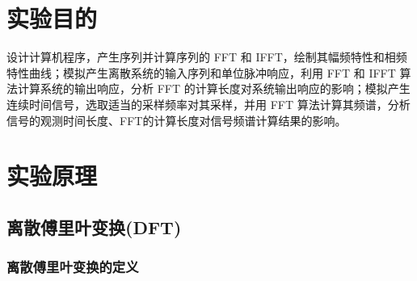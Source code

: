 \documentclass[12pt,AutoFakeBold]{article}
\begin{document}
\maketitle
\setcounter{tocdepth}{2}
\tableofcontents  %

\makeatletter
\begin{center}
    \LARGE \textbf{\textsf{\@problem}}
\end{center}
\makeatother

\section{实验目的}

设计计算机程序，产生序列并计算序列的 FFT 和 IFFT，绘制其幅频特性和相频特性曲线；模拟产生离散系统的输入序列和单位脉冲响应，利用 FFT 和 IFFT 算法计算系统的输出响应，分析 FFT 的计算长度对系统输出响应的影响；模拟产生连续时间信号，选取适当的采样频率对其采样，并用 FFT 算法计算其频谱，分析信号的观测时间长度、FFT的计算长度对信号频谱计算结果的影响。

\section{实验原理}

\subsection{离散傅里叶变换(DFT)}

\subsubsection{离散傅里叶变换的定义}
\end{document}
